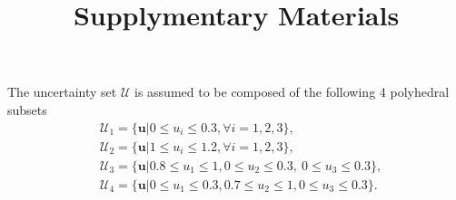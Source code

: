 \documentclass{article}
\title{Supplymentary Materials}
\date{}
\begin{document}
The uncertainty set $\mathcal{U}$ is assumed to be composed of the following 4 polyhedral subsets
\begin{subequations}
    \begin{align*}
       & \mathcal{U}_1 = \{\mathbf{u}|0\leq u_i \leq 0.3,\forall i = 1,2,3\}, \\
       & \mathcal{U}_2 = \{\mathbf{u}|1 \leq u_i \leq 1.2,\forall i = 1,2,3 \},\\
       & \mathcal{U}_3 = \{\mathbf{u}|0.8\leq u_1 \leq 1, 0\leq u_2 \leq 0.3,\ 0\leq u_3 \leq 0.3\},\\
       & \mathcal{U}_4 = \{\mathbf{u}| 0\leq u_1\leq 0.3,0.7\leq u_2\leq 1,0\leq u_3\leq 0.3\}.
    \end{align*}
\end{subequations}
\end{document}

